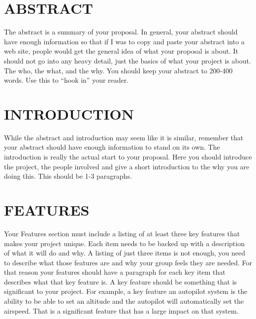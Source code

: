\documentclass[12pt]{article}
\begin{document}
\tableofcontents
\pagebreak

\section{ABSTRACT}
The abstract is a summary of your proposal. In general, your abstract should have enough information so that if I was to copy and paste your abstract into a web site, people would get the general idea of what your proposal is about. It should not go into any heavy detail, just the basics of what your project is about. The who, the what, and the why. You should keep your abstract to 200-400 words. Use this to ``hook in'' your reader.

\section{INTRODUCTION}
While the abstract and introduction may seem like it is similar, remember that your abstract should have enough information to stand on its own. The introduction is really the actual start to your proposal. Here you should introduce the project, the people involved and give a short introduction to the why you are doing this. This should be 1-3 paragraphs.

\section{FEATURES}
Your Features section must include a listing of at least three key features that makes your project unique. Each item needs to be backed up with a description of what it will do and why. A listing of just three items is not enough, you need to describe what those features are and why your group feels they are needed. For that reason your features should have a paragraph for each key item that describes what that key feature is. A key feature should be something that is significant to your project. For example, a key feature an autopilot system is the ability to be able to set an altitude and the autopilot will automatically set the airspeed. That is a significant feature that has a large impact on that system.
\end{document}
